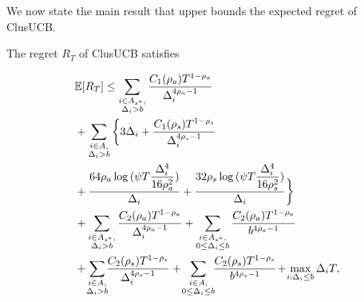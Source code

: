 	
We now state the main result that upper bounds the expected regret of ClusUCB.
	
\begin{theorem}
\label{Result:Theorem:1}
The regret $R_T$ of ClusUCB satisfies

\begin{align*}
&\E [R_{T}]\leq 
\sum\limits_{\substack{i\in A_{s^{*}},\\\Delta_{i} > b}}\dfrac{C_1(\rho_{a})T^{1-\rho_{a}}}{\Delta_{i}^{4\rho_{a}-1}} \\
&
+ \sum\limits_{\substack{i\in A,\\\Delta_{i} > b}} \bigg\lbrace 3\Delta_{i}+
\dfrac{C_1(\rho_{s})T^{1-\rho_{s}}}{\Delta_{i}^{4\rho_{s}-1}} \\
&+ \frac{64\rho_{a}\log{(\psi T\dfrac{\Delta_{i}^{4}}{16\rho_{a}^{2}})}}{\Delta_{i}} 
+ \dfrac{32\rho_{s}\log{(\psi T\dfrac{\Delta_{i}^{4}}{16\rho_{s}^{2}})}}{\Delta_{i}}\bigg\rbrace \\
&+ \sum\limits_{\substack{i\in A_{s^{*}},\\ \Delta_{i} > b}} 
\frac{C_2(\rho_{a})T^{1-\rho_{a}}}{\Delta_{i}^{4\rho_{a}-1}}
+\sum\limits_{\substack{i\in A_{s^{*}},\\0\leq\Delta_{i}\leq b}}\frac{C_2(\rho_a)T^{1-\rho_{a}}}{b^{4\rho_{a} -1}}\\ 
&+ \!\sum\limits_{\substack{i\in A,\\ \Delta_{i} > b}}\! \! \dfrac{C_2(\rho_{s})T^{1-\rho_{s}}}{\Delta_{i}^{4\rho_{s}-1}}
 + \!\sum\limits_{\substack{i\in A,\\0\leq\Delta_{i}\leq b}}\! \! \dfrac{C_2(\rho_{s})T^{1-\rho_{s}}}{b^{4\rho_{s} -1}}  
\!+\! \max\limits_{i:\Delta_{i}\leq b}\Delta_{i}T, 
\end{align*}


\end{theorem}
